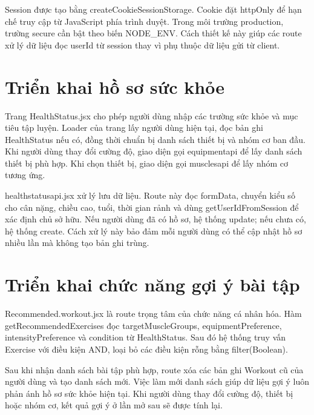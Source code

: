 Session được tạo bằng createCookieSessionStorage. Cookie đặt httpOnly để hạn chế truy cập từ JavaScript phía trình duyệt. Trong môi trường production, trường secure cần bật theo biến NODE\_ENV. Cách thiết kế này giúp các route xử lý dữ liệu đọc userId từ session thay vì phụ thuộc dữ liệu gửi từ client.


\section{Triển khai hồ sơ sức khỏe}

Trang HealthStatus.jsx cho phép người dùng nhập các trường sức khỏe và mục tiêu tập luyện. Loader của trang lấy người dùng hiện tại, đọc bản ghi HealthStatus nếu có, đồng thời chuẩn bị danh sách thiết bị và nhóm cơ ban đầu. Khi người dùng thay đổi cường độ, giao diện gọi equipmentapi để lấy danh sách thiết bị phù hợp. Khi chọn thiết bị, giao diện gọi musclesapi để lấy nhóm cơ tương ứng.


healthstatusapi.jsx xử lý lưu dữ liệu. Route này đọc formData, chuyển kiểu số cho cân nặng, chiều cao, tuổi, thời gian rảnh và dùng getUserIdFromSession để xác định chủ sở hữu. Nếu người dùng đã có hồ sơ, hệ thống update; nếu chưa có, hệ thống create. Cách xử lý này bảo đảm mỗi người dùng có thể cập nhật hồ sơ nhiều lần mà không tạo bản ghi trùng.


\section{Triển khai chức năng gợi ý bài tập}

Recommended.workout.jsx là route trọng tâm của chức năng cá nhân hóa. Hàm getRecommendedExercises đọc targetMuscleGroups, equipmentPreference, intensityPreference và condition từ HealthStatus. Sau đó hệ thống truy vấn Exercise với điều kiện AND, loại bỏ các điều kiện rỗng bằng filter(Boolean).


Sau khi nhận danh sách bài tập phù hợp, route xóa các bản ghi Workout cũ của người dùng và tạo danh sách mới. Việc làm mới danh sách giúp dữ liệu gợi ý luôn phản ánh hồ sơ sức khỏe hiện tại. Khi người dùng thay đổi cường độ, thiết bị hoặc nhóm cơ, kết quả gợi ý ở lần mở sau sẽ được tính lại.


